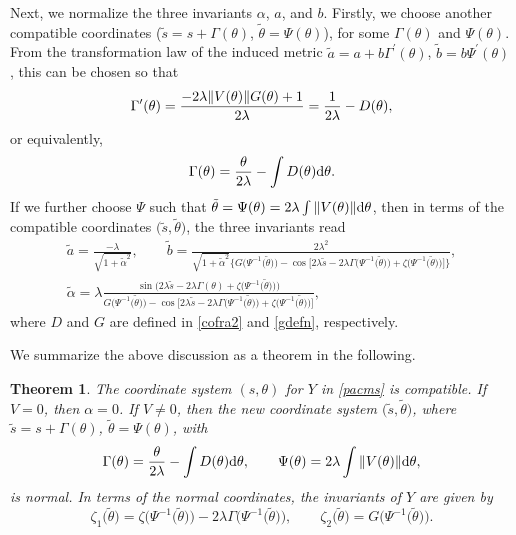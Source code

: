 \documentclass[pdftex]{sigma}
\numberwithin{equation}{section}
\newtheorem{Theorem}{Theorem}[section]
\begin{document}
Next, we normalize the three invariants $\alpha $, $a$, and $b$.
Firstly, we choose another compatible coordinates ($ \tilde{s}=s+\Gamma
( \theta )$, $\tilde{\theta}=\Psi ( \theta ) $), for some $\Gamma ( \theta ) $ and $\Psi ( \theta
) $. From the transformation law of the induced metric
$
\tilde{a}=a+b\Gamma^{\prime }( \theta )$, $\tilde{b}=b\Psi
^{\prime }( \theta )$,
this can be chosen so that
\begin{gather*}
\Gamma ^{\prime}( \theta ) =\frac{-2\lambda \Vert V(
\theta ) \Vert G( \theta ) +1}{2\lambda } =\frac{1}{2\lambda }-D( \theta ) , \notag
\end{gather*}
or equivalently,
\begin{equation*}%
\Gamma ( \theta ) =\frac{\theta }{2\lambda }-\int D( \theta
) {\rm d}\theta .
\end{equation*}
If we further choose $\Psi $ such that $\tilde{\theta}=\Psi ( \theta
) =2\lambda \int \Vert V( \theta ) \Vert
{\rm d}\theta $, then in terms of the compatible coordinates $\bigl( \tilde{s},\tilde{\theta}\bigr) $, the three invariants read
\begin{gather*}
\tilde{a} = \frac{-\lambda }{\sqrt{1+\tilde{\alpha}^{2}}}, \qquad
\tilde{b} = \frac{2\lambda ^{2}}{\sqrt{1+\tilde{\alpha}^{2}}\big\{
G\bigl( \Psi ^{-1}\bigl( \tilde{\theta}\bigr) \bigr) -\cos \bigl[ 2\lambda
\tilde{s}-2\lambda \Gamma \bigl( \Psi ^{-1}\bigl( \tilde{\theta}\bigr)
\bigr) +\zeta \bigl( \Psi ^{-1}\bigl( \tilde{\theta}\bigr) \bigr) \bigr]
\big\} }, \\
\tilde{\alpha} = \lambda \frac{\sin \bigl( 2\lambda \tilde{s}-2\lambda
\Gamma ( \theta ) +\zeta \bigl( \Psi ^{-1}\bigl( \tilde{\theta}
\bigr) \bigr) \bigr) }{G\bigl( \Psi ^{-1}\bigl( \tilde{\theta}\bigr)
\bigr) -\cos \bigl[ 2\lambda \tilde{s}-2\lambda \Gamma \bigl( \Psi
^{-1}\bigl( \tilde{\theta}\bigr) \bigr) +\zeta \bigl( \Psi ^{-1}\bigl(
\tilde{\theta}\bigr) \bigr) \bigr] },
\end{gather*}
where $D$ and $G$ are defined in \eqref{cofra2} and \eqref{gdefn}, respectively.

We summarize the above discussion as a theorem in the following.

\begin{Theorem}
\label{construction} The coordinate system $(s,\theta)$ for $Y$ in \eqref{pacms}
is compatible. If $V=0$, then $\alpha=0$. If $V\neq 0$, then the new coordinate system $\bigl(\tilde{s},\tilde{\theta}\bigr)$, where
$
\tilde{s}=s+\Gamma(\theta)$, $ \tilde{\theta}=\Psi( \theta)$,
with
\[
\Gamma(\theta)=\frac{\theta }{2\lambda}-\int D( \theta) {\rm d}\theta,\qquad
\Psi(\theta)=2\lambda \int \Vert V(\theta) \Vert {\rm d}\theta ,
\]
is normal. In terms of the
normal coordinates, the invariants of $Y$ are given by
\begin{equation}
\zeta _{1}\bigl( \tilde{\theta}\bigr) = \zeta \bigl( \Psi ^{-1}\bigl(
\tilde{\theta}\bigr) \bigr) -2\lambda \Gamma \bigl( \Psi ^{-1}\bigl(
\tilde{\theta}\bigr) \bigr) , \qquad
\zeta _{2}\bigl( \tilde{\theta}\bigr) = G\bigl( \Psi ^{-1}\bigl( \tilde{
\theta}\bigr) \bigr). \label{invariants}
\end{equation}
\end{Theorem}
\end{document}
